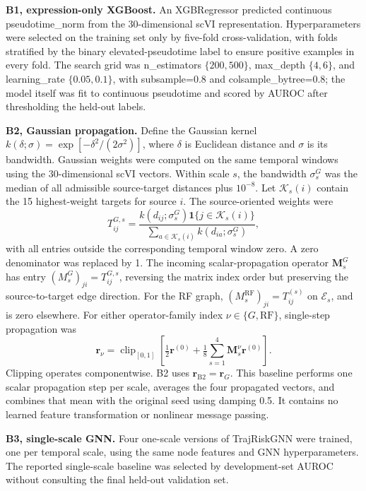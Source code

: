 \textbf{B1, expression-only XGBoost.} An XGBRegressor predicted continuous pseudotime\_norm from the 30-dimensional scVI representation. Hyperparameters were selected on the training set only by five-fold cross-validation, with folds stratified by the binary elevated-pseudotime label to ensure positive examples in every fold. The search grid was n\_estimators \(\{200, 500\}\), max\_depth \(\{4, 6\}\), and learning\_rate \(\{0.05, 0.1\}\), with subsample=0.8 and colsample\_bytree=0.8; the model itself was fit to continuous pseudotime and scored by AUROC after thresholding the held-out labels.

\textbf{B2, Gaussian propagation.} Define the Gaussian kernel \(k(\delta;\sigma)=\exp[-\delta^2/(2\sigma^2)]\), where \(\delta\) is Euclidean distance and \(\sigma\) is its bandwidth. Gaussian weights were computed on the same temporal windows using the 30-dimensional scVI vectors. Within scale \(s\), the bandwidth \(\sigma_s^{G}\) was the median of all admissible source-target distances plus \(10^{-8}\). Let \(\mathcal K_s(i)\) contain the 15 highest-weight targets for source \(i\). The source-oriented weights were
\begin{equation}\label{eq:gaussian-transitions}
T_{ij}^{G,s}=
\frac{k(d_{ij};\sigma_s^{G})\mathbf1\{j\in\mathcal K_s(i)\}}
{\sum_{a\in\mathcal K_s(i)}k(d_{ia};\sigma_s^{G})},
\end{equation}
with all entries outside the corresponding temporal window zero. A zero denominator was replaced by 1. The incoming scalar-propagation operator \(\mathbf M_s^{G}\) has entry \((M_s^{G})_{ji}=T_{ij}^{G,s}\), reversing the matrix index order but preserving the source-to-target edge direction. For the RF graph, \((M_s^{\mathrm{RF}})_{ji}=T_{ij}^{(s)}\) on \(\mathcal E_s\), and is zero elsewhere. For either operator-family index \(\nu\in\{G,\mathrm{RF}\}\), single-step propagation was
\begin{equation}\label{eq:scalar-propagation}
\boldsymbol r_\nu=
\operatorname{clip}_{[0,1]}\!\left[
\tfrac12\boldsymbol r^{(0)}+
\tfrac18\sum_{s=1}^{4}\mathbf M_s^{\nu}\boldsymbol r^{(0)}\right].
\end{equation}
Clipping operates componentwise. B2 uses \(\boldsymbol r_{\mathrm{B2}}=\boldsymbol r_G\). This baseline performs one scalar propagation step per scale, averages the four propagated vectors, and combines that mean with the original seed using damping 0.5. It contains no learned feature transformation or nonlinear message passing.

\textbf{B3, single-scale GNN.} Four one-scale versions of TrajRiskGNN were trained, one per temporal scale, using the same node features and GNN hyperparameters. The reported single-scale baseline was selected by development-set AUROC without consulting the final held-out validation set.

